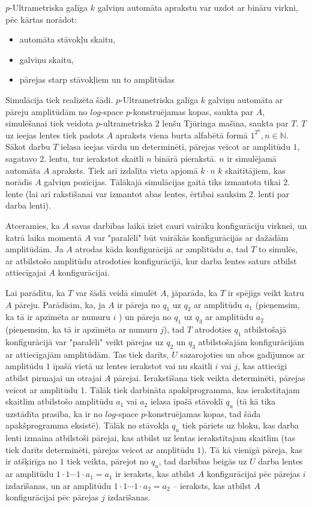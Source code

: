 \documentclass{ludis}
\begin{document}
$p$-Ultrametriska galīga $k$ galviņu automāta aprakstu var uzdot ar bināru virkni, pēc kārtas norādot:
\begin{itemize}
	\item automāta stāvokļu skaitu,
	\item galviņu skaitu,
	\item pārejas starp stāvokļiem un to amplitūdas %
\end{itemize}

Simulācija tiek realizēta šādi. $p$-Ultrametriska galīga $k$ galviņu automāta ar pāreju amplitūdām no $log$-space $p$-konstruējamas kopas, saukta par $A$, simulēšanai tiek veidota $p$-ultrametriska $2$ lenšu Tjūringa mašīna, saukta par $T$. $T$ uz ieejas lentes tiek padots $A$ apraksts viena burta alfabētā formā $1^{2^n}, n \in \mathbb{N}$. Sākot darbu $T$ ielasa ieejas vārdu un determinēti, pārejas veicot ar amplitūdu $1$, sagatavo 2. lentu, tur ierakstot skaitli $n$ binārā pierakstā. $n$ ir simulējamā automāta $A$ apraksts. Tiek arī izdalīta vieta apjomā $k \cdot n$ $k$ skaitītājiem, kas norādīs $A$ galviņu pozīcijas. Tālākajā simulācijas gaitā tiks izmantota tikai 2. lente (lai arī rakstīšanai var izmantot abas lentes, ērtībai sauksim 2. lenti par darba lenti).

Atceramies, ka $A$ savas darbības laikā iziet cauri vairāku konfigurāciju virknei, un katrā laika momentā $A$ var "paralēli" būt vairākās konfigurācijās ar dažādām amplitūdām.
Ja $A$ atrodas kāda konfigurācijā ar amplitūdu $a$, tad $T$ to simulēs, ar atbilstošo amplitūdu atrodoties konfigurācijā, kur darba lentes saturs atbilst attiecīgajai $A$ konfigurācijai.

Lai parādītu, ka $T$ var šādā veidā simulēt $A$, jāparāda, ka $T$ ir spējīgs veikt katru $A$ pāreju. Parādīsim, ka, ja $A$ ir pāreja no $q_1$ uz $q_2$ ar amplitūdu $a_1$ (pieņemsim, ka tā ir apzīmēta ar numuru $i$ ) un pāreja no $q_1$ uz $q_3$ ar amplitūdu $a_2$ (pieņemsim, ka tā ir apzīmēta ar numuru $j$), tad $T$ atrodoties $q_1$ atbilstošajā konfigurācijā var "paralēli" veikt pārejas uz $q_2$ un $q_3$ atbilstošajām konfigurācijām ar attiecīgajām amplitūdām. Tas tiek darīts, $U$ sazarojoties un abos gadījumos ar amplitūdu $1$ īpašā vietā uz lentes ierakstot vai nu skaitli $i$ vai $j$, kas attiecīgi atbilst pirmajai un otrajai $A$ pārejai. Ierakstīšana tiek veikta determinēti, pārejas veicot ar amplitūdu $1$. Tālāk tiek darbināta apakšprogramma, kas ierakstītajam skaitlim atbilstošo amplitūdu $a_1$ vai $a_2$ ielasa īpašā stāvoklī $q_u$ (tā kā tika uzstādīta prasība, ka ir no $log$-space $p$-konstruējamas kopas, tad šāda apakšprogramma eksistē). Tālāk no stāvokļa $q_u$ tiek pāriets uz bloku, kas darba lenti izmaina atbilstoši pārejai, kas atbilst uz lentas ierakstītajam skaitlim (tas tiek darīts determinēti, pārejas veicot ar amplitūdu $1$). Tā kā vienīgā pāreja, kas ir atšķirīga no $1$ tiek veikta, pārejot no $q_u$, tad darbības beigās uz $U$ darba lentes ar amplitūdu $1 \cdot 1 \cdots 1 \cdot a_1 = a_1$ ir ieraksts, kas atbilst $A$ konfigurācijai pēc pārejas $i$ izdarīšanas, un ar amplitūdu $1 \cdot 1 \cdots 1 \cdot a_2 = a_2$ -- ieraksts, kas atbilst $A$ konfigurācijai pēc pārejas $j$ izdarīšanas.
\end{document}
